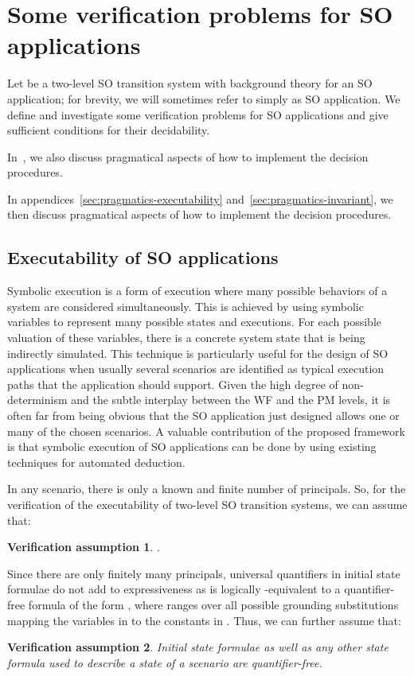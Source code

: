 \documentclass[conference]{IEEEtran}
\newtheorem{verification-assumption}{Verification assumption}
\newcommand{\close}{\IEEEQEDclosed}
\begin{document}
\section{Some verification problems for SO applications}
\label{sec:verification}
Let  be a
two-level SO transition system with background theory 
for an SO application; for brevity, we will sometimes refer to
 simply as SO application. We define and investigate some
verification problems for SO applications and give sufficient
conditions for their decidability.
\begin{SHORT}
In~\cite{BRV-TR09}, we also
discuss pragmatical aspects of how to implement the decision procedures.
\end{SHORT}
\begin{LONG}
In appendices~\ref{sec:pragmatics-executability} and~\ref{sec:pragmatics-invariant}, we then 
discuss pragmatical aspects of how to implement the decision procedures.
\end{LONG}

\subsection{Executability of SO applications}
\label{sec:exec-so-apps}

Symbolic execution is a form of execution where many possible
behaviors of a system are considered simultaneously. This is achieved
by using symbolic variables to represent many possible states and
executions. For each possible valuation of these variables, there is a
concrete system state that is being indirectly simulated.  This
technique is particularly useful for the design of SO applications when
usually several scenarios are identified as typical execution paths
that the application should support.  Given the high degree of
non-determinism and the subtle interplay between the WF and
the PM levels, it is often far from being obvious that the SO
application just designed allows one or many of the chosen scenarios.  A
valuable contribution of the proposed framework is that symbolic
execution of SO applications can be done by using existing techniques
for automated deduction.  

In any scenario, there is only a known and finite number of principals. So, for the verification of the executability of two-level SO transition systems, 
we can assume that:
\begin{verification-assumption}
. \hfill \close
\end{verification-assumption}
Since there are only finitely many principals, universal quantifiers in initial state formulae do not add to expressiveness as  is logically -equivalent to a quantifier-free formula of the form ,
where  ranges over all possible grounding substitutions mapping the variables in  to the constants in .  Thus, we can further assume that:
\begin{verification-assumption}
Initial state formulae as well as any other state formula used to describe a state of a scenario are quantifier-free. \hfill \close
\end{verification-assumption}
\end{document}
